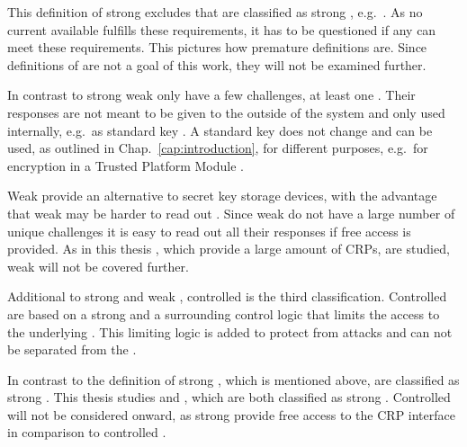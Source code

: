 This definition of strong \pufs excludes \pufs that are classified as strong \puf, e.g.\ \xpufs \cite{Becker2015ThePUFs}.
As no current available \puf fulfills these requirements, it has to be questioned if any \puf can meet these requirements.
This pictures how premature \puf definitions are.
Since definitions of \pufs are not a goal of this work, they will not be examined further.

In contrast to strong \pufs weak \pufs only have a few challenges, at least one \cite{Ruhrmair2014PUFsGlance}.
Their responses are not meant to be given to the outside of the system and only used internally, e.g.\ as standard key \cite{Ruhrmair2012AnPUFs}. %
A standard key does not change and can be used, as outlined in Chap.\ \ref{cap:introduction}, for different purposes, e.g.\ for encryption in a Trusted Platform Module \cite{TCG2011TPMPrinciples}. %

Weak \pufs provide an alternative to secret key storage devices, with the advantage that weak \pufs may be harder to read out \cite{Lim2005ExtractingCircuits}.
Since weak \pufs do not have a large number of unique challenges it is easy to read out all their responses if free access is provided.
As in this thesis \pufs, which provide a large amount of \acp{CRP}, are studied, weak \pufs will not be covered further.

Additional to strong \puf and weak \puf, controlled \pufs is the third classification.
Controlled \pufs are based on a strong \pufs and a surrounding control logic that limits the access to the underlying \puf.
This limiting logic is added to protect \pufs from attacks and can not be separated from the \puf \cite{Ruhrmair2013PUFData,Gassend2007ControlledFunctions}. %

In contrast to the definition of strong \pufs, which is mentioned above, \apufs are classified as strong \puf \cite{Ruhrmair2010StrongProofs}.
This thesis studies \apufs and \xpufs, which are both classified as strong \puf.  
Controlled \pufs will not be considered onward, as strong \pufs provide free access to the \ac{CRP} interface in comparison to controlled \pufs. %

